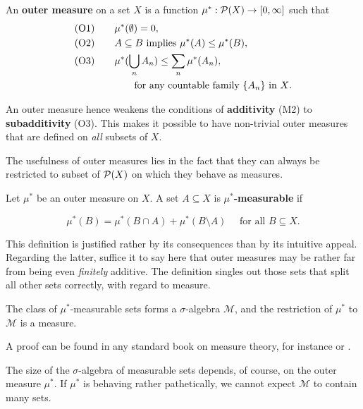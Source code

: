\begin{definition}\label{def-outer-measure}An \textbf{outer measure} on a set $X$ is a function $\mu^*: \mathcal{P}(X) \to [0,\infty]$ such that
\begin{align*}
    (\operatorname{O1}) & \qquad  \mu^*(\emptyset) = 0,\\
    (\operatorname{O2}) & \qquad  A \subseteq B \text{ implies } \mu^*(A) \leq \mu^*(B), \\
    (\operatorname{O3}) & \qquad  \mu^*(\bigcup_n A_n) \leq \sum_n \mu^*(A_n), \\
         & \qquad  \qquad \text{for any countable family  $\{A_n\}$ in $X$}.
\end{align*}
\end{definition}An outer measure hence weakens the conditions of \textbf{additivity} (M2) to \textbf{subadditivity} (O3). This makes it possible to have non-trivial outer measures that are defined on \textit{all} subsets of $X$.

The usefulness of outer measures lies in the fact that they can always be restricted to subset of $\mathcal{P}(X)$ on which they behave as measures.

\begin{definition}\label{def-measurable}Let $\mu^*$ be an outer measure on $X$. A set $A \subseteq X$ is \textbf{$\mu^*$-measurable} if

\begin{equation}
\mu^*(B) = \mu^*(B \cap A) + \mu^*(B \setminus A) \quad \text{ for all $B \subseteq X$}.
\end{equation}

\end{definition}This definition is justified rather by its consequences than by its intuitive appeal. Regarding the latter, suffice it to say here that outer measures may be rather far from being even \textit{finitely} additive. The definition singles out those sets that split all other sets correctly, with regard to measure.

\begin{proposition}\label{prop-measurable-sets}The class of $\mu^*$-measurable sets forms a $\sigma$-algebra $\mathcal{M}$, and the restriction of $\mu^*$ to $\mathcal{M}$ is a measure.

\end{proposition}A proof can be found in any standard book on measure theory, for instance \cite{Halmos:1950a} or \cite{RoydenFitzpatrick_1988n}.

The size of the $\sigma$-algebra of measurable sets depends, of course, on the outer measure $\mu^*$. If $\mu^*$ is behaving rather pathetically, we cannot expect $\mathcal{M}$ to contain many sets.

